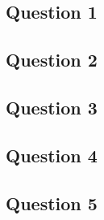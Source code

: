 \documentclass{article}
\begin{document}
\subsection{Question 1}

\subsection{Question 2}

\subsection{Question 3}

\subsection{Question 4}

\subsection{Question 5}

\end{document}
